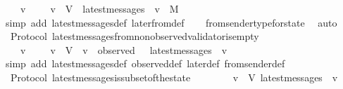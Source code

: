 \begin{isabellebody}
\ \ {\isachardoublequoteopen}{\isasymforall}\ {\isasymsigma}\ v{\isachardot}\ {\isasymsigma}\ {\isasymin}\ {\isasymSigma}\ {\isasymand}\ v\ {\isasymin}\ V\ {\isasymlongrightarrow}\ latest{\isacharunderscore}messages\ {\isasymsigma}\ v\ {\isasymsubseteq}\ M{\isachardoublequoteclose}\isanewline
%
\isadelimproof
\ \ %
\endisadelimproof
%
\isatagproof
{}\isamarkupfalse%
\ {\isacharparenleft}simp\ add{\isacharcolon}\ latest{\isacharunderscore}messages{\isacharunderscore}def\ later{\isacharunderscore}from{\isacharunderscore}def{\isacharparenright}\isanewline
\ \ \isamarkupfalse%
\ from{\isacharunderscore}sender{\isacharunderscore}type{\isacharunderscore}for{\isacharunderscore}state\ \isamarkupfalse%
\ auto%
\endisatagproof
{\isafoldproof}%
%
\isadelimproof
\isanewline
%
\endisadelimproof
\isanewline
{}\isamarkupfalse%
\ {\isacharparenleft}\ Protocol{\isacharparenright}\ latest{\isacharunderscore}messages{\isacharunderscore}from{\isacharunderscore}non{\isacharunderscore}observed{\isacharunderscore}validator{\isacharunderscore}is{\isacharunderscore}empty\ {\isacharcolon}\isanewline
\ \ {\isachardoublequoteopen}{\isasymforall}\ {\isasymsigma}\ v{\isachardot}\ {\isasymsigma}\ {\isasymin}\ {\isasymSigma}\ {\isasymand}\ v\ {\isasymin}\ V\ {\isasymand}\ v\ {\isasymnotin}\ observed\ {\isasymsigma}\ {\isasymlongrightarrow}\ latest{\isacharunderscore}messages\ {\isasymsigma}\ v\ {\isacharequal}\ {\isasymemptyset}{\isachardoublequoteclose}\isanewline
%
\isadelimproof
\ \ %
\endisadelimproof
%
\isatagproof
{}\isamarkupfalse%
\ {\isacharparenleft}simp\ add{\isacharcolon}\ latest{\isacharunderscore}messages{\isacharunderscore}def\ observed{\isacharunderscore}def\ later{\isacharunderscore}def\ from{\isacharunderscore}sender{\isacharunderscore}def{\isacharparenright}%
\endisatagproof
{\isafoldproof}%
%
\isadelimproof
\isanewline
%
\endisadelimproof
\isanewline
{}\isamarkupfalse%
\ {\isacharparenleft}\ Protocol{\isacharparenright}\ latest{\isacharunderscore}messages{\isacharunderscore}is{\isacharunderscore}subset{\isacharunderscore}of{\isacharunderscore}the{\isacharunderscore}state\ {\isacharcolon}\isanewline
\ \ {\isachardoublequoteopen}{\isasymforall}\ {\isasymsigma}\ {\isasymin}\ {\isasymSigma}{\isachardot}\ {\isasymforall}\ v\ {\isasymin}\ V{\isachardot}\ latest{\isacharunderscore}messages\ {\isasymsigma}\ v\ {\isasymsubseteq}\ {\isasymsigma}{\isachardoublequoteclose}\isanewline
%
\isadelimproof
\ \ %
\endisadelimproof
%
\isatagproof
{}\isamarkupfalse%

\end{isabellebody}
